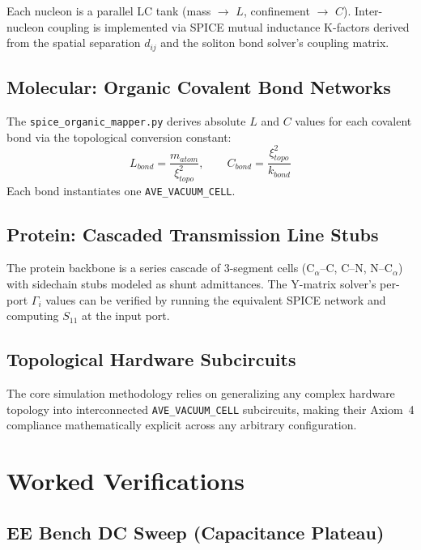 Each nucleon is a parallel LC tank (mass $\to$ $L$, confinement $\to$ $C$).
Inter-nucleon coupling is implemented via SPICE mutual inductance
K-factors derived from the spatial separation $d_{ij}$ and the soliton
bond solver's coupling matrix.

\subsection{Molecular: Organic Covalent Bond Networks}

The \texttt{spice\_organic\_mapper.py} derives absolute $L$ and $C$
values for each covalent bond via the topological conversion constant:
\begin{equation}
    L_{bond} = \frac{m_{atom}}{\xi_{topo}^2}, \qquad
    C_{bond} = \frac{\xi_{topo}^2}{k_{bond}}
\end{equation}
Each bond instantiates one \texttt{AVE\_VACUUM\_CELL}.

\subsection{Protein: Cascaded Transmission Line Stubs}

The protein backbone is a series cascade of 3-segment cells
(C$_\alpha$--C, C--N, N--C$_\alpha$) with sidechain stubs modeled
as shunt admittances.  The Y-matrix solver's per-port $\Gamma_i$
values can be verified by running the equivalent SPICE network
and computing $S_{11}$ at the input port.

\subsection{Topological Hardware Subcircuits}

The core simulation methodology relies on generalizing any complex hardware topology into interconnected \texttt{AVE\_VACUUM\_CELL} subcircuits, making their Axiom~4 compliance mathematically explicit across any arbitrary configuration.


\section{Worked Verifications}
\label{sec:spice_verifications}

\subsection{EE Bench DC Sweep (Capacitance Plateau)}

